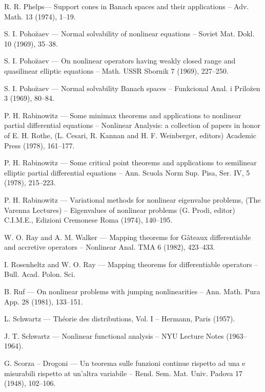 \begin{thebibliography}{}
 R. R. Phelps\pageoriginale --- Support cones in Banach
  spaces and 
  their applications -- Adv. Math. 13 (1974), 1--19.

 S. I. Poho\u{z}aev --- Normal solvability of nonlinear
  equations -- Soviet Mat. Dokl. 10 (1969), 35--38.

 S. I. Poho\u{z}aev --- On nonlinear operators having
  weakly closed range and quasilinear elliptic equations -- Math. USSR
  Sbornik 7 (1969), 227--250.

 S. I. Poho\u{z}aev --- Normal solvability Banach
  spaces -- Funkcional Anal. i Prilo\u{z}en 3 (1969), 80--84.

 P. H. Rabinowitz --- Some minimax theorems and
  applications to nonlinear partial differential equations --
  Nonlinear Analysis: a collection of papers in honor of E. H. Rothe,
  (L. Cesari, R. Kannan and H. F. Weinberger, editors) Academic Press
  (1978), 161--177.

 P. H. Rabinowitz --- Some critical point theorems and
  applications to semilinear elliptic partial differential equations
  -- Ann. Scuola Norm Sup. Pisa, Ser. IV, 5 (1978), 215--223.

 P. H. Rabinowitz --- Variational methods for nonlinear
  eigenvalue problems, (The Varenna Lectures) -- Eigenvalues of
  nonlinear problems (G. Prodi, editor) C.I.M.E., Edizioni Cremonese
  Roma (1974), 140--195.

 W. O. Ray and A. M. Walker --- Mapping theorems for
  G\^ateaux differentiable and accretive operators -- Nonlinear
  Anal. TMA 6 (1982), 423--433.

 I. Rosenheltz and W. O. Ray --- Mapping theorems for
  differentiable operators -- Bull. Acad. Polon. Sci.

 B. Ruf --- On nonlinear problems with jumping
  nonlinearities -- Ann. Math. Pura App. 28 (1981), 133--151.

 L. Schwartz --- Th\'eorie des distributions, Vol. I --
  Hermann, Paris (1957). 

 J. T. Schwartz --- Nonlinear functional analysis --
  NYU Lecture Notes (1963--1964).

 G. Scorza -- Drogoni --- Un teorema sulle funzioni
  continue rispetto ad una e misurabili rispetto at un'altra variabile
  -- Rend. Sem. Mat. Univ. Padova 17 (1948), 102--106.


\end{thebibliography}
